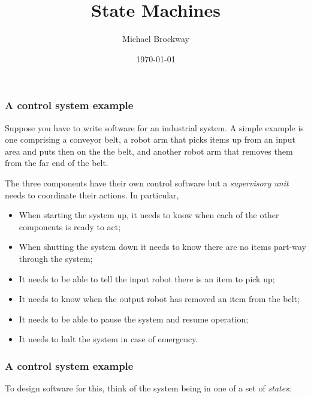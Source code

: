 \documentclass[10pt, hyperref={pdfpagelabels=false}]{beamer}
\title{State Machines}
\author{Michael Brockway}
\date{\today}
\begin{document}
\begin{frame}
\titlepage
\end{frame}

\begin{frame}
\frametitle{A control system example}
Suppose you have to write software for an industrial system. A simple example is one comprising a conveyor belt, a robot arm that picks items up from an input area and puts then on the the belt, and another robot arm that removes them from the far end of the belt.

The three components have their own control software but a \emph{supervisory unit} needs to coordinate their actions. In particular,
\begin{itemize}
\item When starting the system up, it needs to know when each of the other components is ready to act;
\item When shutting the system down it needs to know there are no items part-way through the system;
\item It needs to be able to tell the input robot there is an item to pick up;
\item It needs to know when the output robot has removed an item from the belt;
\item It needs to be able to pause the system and resume operation;
\item It needs to halt the system in case of emergency.
\end{itemize}
\end{frame}

\begin{frame}
\frametitle{A control system example}
To design software for this, think of the system being in one of a set of \emph{states}:
\begin{center}
\end{center}
\end{frame}
\end{document}
